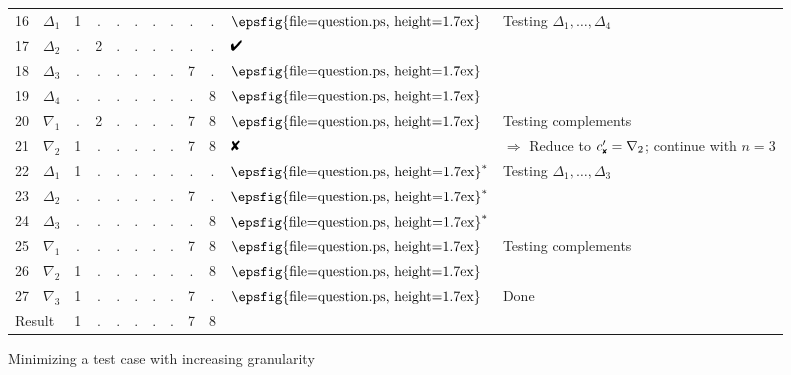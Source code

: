 \documentclass{acm_proc_article-sp}
\newcommand{\PASS}{\text{\ding{52}}\xspace}
\newcommand{\FAIL}{\text{\ding{56}}\xspace}
\newcommand{\UNRESOLVED}{\lower0.1ex\hbox{\epsfig{file=question.ps, 
      height=1.7ex}}}
\newcommand{\dfail}{{c'_{\scriptscriptstyle \FAIL}}}
\theoremstyle{plain}
\begin{document}
\begin{figure*}[t]
\begin{center}
\begin{tabular}{r|c|cccccccc|ll}
     16 & $\Delta_1$ & 1 & . & . & . & . & . & . & . & $\UNRESOLVED$ & Testing $\Delta_1, \ldots, \Delta_4$ \\ 
     17 & $\Delta_2$ & . & 2 & . & . & . & . & . & . & $\PASS$ \\
     18 & $\Delta_3$ & . & . & . & . & . & . & 7 & . & $\UNRESOLVED$ \\
     19 & $\Delta_4$ & . & . & . & . & . & . & . & 8 & $\UNRESOLVED$ \\
     20 & $\nabla_1$ & . & 2 & . & . & . & . & 7 & 8 & $\UNRESOLVED$ & Testing complements \\
     21 & $\nabla_2$ & 1 & . & . & . & . & . & 7 & 8 & $\FAIL$ & 
          $\Rightarrow$ Reduce to $\dfail = \nabla_2$; continue with $n = 3$ \\ \cline{1-11}
     22 & $\Delta_1$ & 1 & . & . & . & . & . & . & . & $\UNRESOLVED^*$ & Testing $\Delta_1, \ldots, \Delta_3$ \\
     23 & $\Delta_2$ & . & . & . & . & . & . & 7 & . & $\UNRESOLVED^*$ \\
     24 & $\Delta_3$ & . & . & . & . & . & . & . & 8 & $\UNRESOLVED^*$ \\
     25 & $\nabla_1$ & . & . & . & . & . & . & 7 & 8 & $\UNRESOLVED$ & Testing complements \\
     26 & $\nabla_2$ & 1 & . & . & . & . & . & . & 8 & $\UNRESOLVED$ \\
     27 & $\nabla_3$ & 1 & . & . & . & . & . & 7 & . & $\UNRESOLVED$ & Done \\
\cline{1-11}
    \multicolumn{2}{l|}{Result} & 1 & . & . & . & . & . & 7 & 8 & &  \\
  \end{tabular}

\end{center}
\vspace{-0.25cm}
\caption{Minimizing a test case with increasing granularity}
\label{fig:minimize}
\end{figure*}
\end{document}
